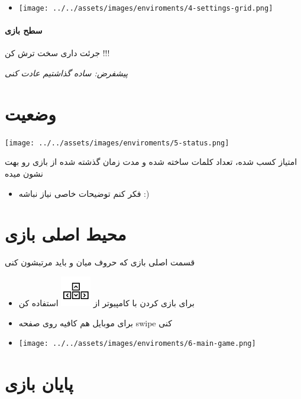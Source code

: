 \documentclass[]{article}
\providecommand{\tightlist}{%
  \setlength{\itemsep}{0pt}\setlength{\parskip}{0pt}}
\let\oldparagraph\paragraph
\renewcommand{\paragraph}[1]{\oldparagraph{#1}\mbox{}}
\begin{document}
\begin{itemize}
\tightlist
\item
  \texttt{[image: ../../assets/images/enviroments/4-settings-grid.png]}
\end{itemize}

\paragraph{سطح بازی}\label{ux633ux637ux62d-ux628ux627ux632ux6cc}

جرئت داری سخت ترش کن !!!

\emph{پیشفرض: ساده گذاشتیم عادت کنی}

\section{وضعیت}\label{ux648ux636ux639ux6ccux62a}

\texttt{[image: ../../assets/images/enviroments/5-status.png]}

امتیاز کسب شده، تعداد کلمات ساخته شده و مدت زمان گذشته شده از بازی رو
بهت نشون میده

\begin{itemize}
\tightlist
\item
  فکر کنم توضیحات خاصی نیاز نباشه :)
\end{itemize}

\section{محیط اصلی
بازی}\label{ux645ux62dux6ccux637-ux627ux635ux644ux6cc-ux628ux627ux632ux6cc}

قسمت اصلی بازی که حروف میان و باید مرتبشون کنی

\begin{itemize}
\item
  برای بازی کردن با کامپیوتر از
  \includegraphics{../../assets/images/arrow-keys.png} استفاده کن
\item
  برای موبایل هم کافیه روی صفحه swipe کنی
\item
  \texttt{[image: ../../assets/images/enviroments/6-main-game.png]}
\end{itemize}

\section{پایان
بازی}\label{ux67eux627ux6ccux627ux646-ux628ux627ux632ux6cc}
\end{document}
